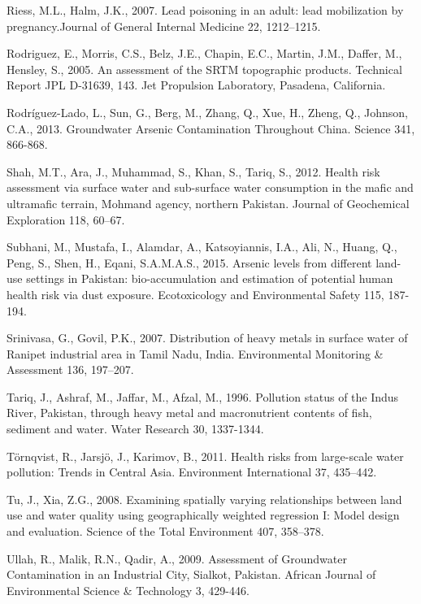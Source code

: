 \begin{thebibliography}
\bibitem{} \hangindent=1cm Riess, M.L., Halm, J.K., 2007. Lead poisoning in an adult: lead mobilization by pregnancy.Journal of General Internal Medicine 22, 1212–1215.

\bibitem{} \hangindent=1cm Rodriguez, E., Morris, C.S., Belz, J.E., Chapin, E.C., Martin, J.M., Daffer, M., Hensley, S.,  2005. An assessment of the SRTM topographic products. Technical Report JPL D-31639, 143. Jet Propulsion Laboratory, Pasadena, California.

\bibitem{} \hangindent=1cm Rodríguez-Lado, L., Sun, G., Berg, M., Zhang, Q., Xue, H., Zheng, Q., Johnson, C.A., 2013. Groundwater Arsenic Contamination Throughout China. Science 341, 866-868.

\bibitem{} \hangindent=1cm Shah, M.T., Ara, J., Muhammad, S., Khan, S., Tariq, S., 2012. Health risk assessment via surface water and sub-surface water consumption in the maﬁc and ultramaﬁc terrain, Mohmand agency, northern Pakistan. Journal of Geochemical Exploration 118, 60–67.

\bibitem{} \hangindent=1cm Subhani, M., Mustafa, I., Alamdar, A., Katsoyiannis, I.A., Ali, N., Huang, Q., Peng, S., Shen, H., Eqani, S.A.M.A.S., 2015. Arsenic levels from different land-use settings in Pakistan: bio-accumulation and estimation of potential human health risk via dust exposure. Ecotoxicology and Environmental Safety 115, 187-194.

\bibitem{} \hangindent=1cm Srinivasa, G., Govil, P.K., 2007. Distribution of heavy metals in surface water of Ranipet industrial area in Tamil Nadu, India. Environmental Monitoring \& Assessment 136, 197–207. 

\bibitem{} \hangindent=1cm Tariq, J., Ashraf, M., Jaffar, M., Afzal, M., 1996. Pollution status of the Indus River, Pakistan, through heavy metal and macronutrient contents of fish, sediment and water. Water Research 30, 1337-1344.

\bibitem{} \hangindent=1cm Törnqvist, R., Jarsjö, J., Karimov, B., 2011. Health risks from large-scale water pollution: Trends in Central Asia. Environment International 37, 435–442.

\bibitem{} \hangindent=1cm Tu, J., Xia, Z.G., 2008. Examining spatially varying relationships between land use and water quality using geographically weighted regression I: Model design and evaluation. Science of the Total Environment 407, 358–378. 

\bibitem{} \hangindent=1cm Ullah, R., Malik, R.N., Qadir, A., 2009. Assessment of Groundwater Contamination in an Industrial City, Sialkot, Pakistan. African Journal of Environmental Science \& Technology 3, 429-446.


\end{thebibliography}
